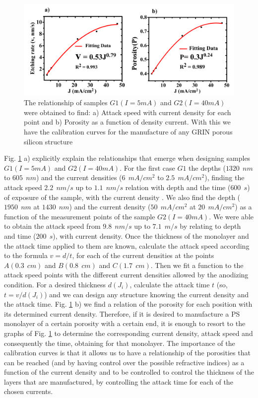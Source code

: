 \documentclass{article}
\begin{document}
\begin{figure}
  \centering
  \includegraphics[width=\textwidth]{Images/grinJD31}
  \caption{The relationship of samples $ G1 (I = 5 mA) $ and $
      G2 (I = 40 mA) $ were obtained to find: a) Attack speed with
      current density for each point and b) Porosity as a function of
      density current. With this we have the calibration curves for
      the manufacture of any GRIN porous silicon structure   }
  \label{fig:Indr1}
\end{figure}
Fig. \ref{fig:Indr1} a) explicitly explain the relationships that
emerge when designing samples $ G1 (I = 5 mA) $ and $ G2 (I = 40 mA)
$. For the first case $ G1 $ the depths ($ 1320 \ \ nm $ to $ 605 \ \
nm $) and the current densities ($ 6 \ \ mA / cm ^ 2 $ to $ 2.5 \ \ mA
/ cm ^ 2 $), finding the attack speed $ 2.2 \ \ nm / s $ up to $ 1.1 \
\ nm / s $ relation with depth and the time ($ 600 \ \ s $) of
exposure of the sample, with the current density . We also find the
depth ($ 1950 \ \ nm $ at $ 1430 \ \ nm $) and the current density ($
50 \ \ mA / cm ^ 2 $ at $ 20 \ \ mA / cm ^ 2 $) as a function of the
measurement points of the sample $ G2 (I = 40 mA) $. We were able to
obtain the attack speed from $ 9.8 \ \ nm / s $ up to $ 7.1 \ \ m / s
$ by relating to depth and time ($ 200 \ \ s $), with current
density. Once the thickness of the monolayer and the attack time
applied to them are known, calculate the attack speed according to the
formula $ v = d / t $, for each of the current densities at the points
$ A ( 0.3 \ \ cm) $ and $ B (0.8 \ \ cm) $ and $ C (1.7 \ \ cm)
$. Then we fit a function to the attack speed points with the
different current densities allowed by the anodizing condition. For a
desired thickness $ d (J_i) $, calculate the attack time $ t $ (so, $
t = v / d (J_i) $) and we can design any structure knowing the current
density and the attack time. Fig. \ref{fig:Indr1} b) we find a
relation of the porosity for each position with its determined current
density. Therefore, if it is desired to manufacture a PS monolayer of
a certain porosity with a certain end, it is enough to resort to the
graphs of Fig. \ref{fig:Indr1} to determine the corresponding current
density, attack speed and consequently the time, obtaining for that
monolayer. The importance of the calibration curves is that it allows
us to have a relationship of the porosities that can be reached (and
by having control over the possible refractive indices) as a function
of the current density and to be controlled to control the thickness
of the layers that are manufactured, by controlling the attack time
for each of the chosen currents.
\end{document}
